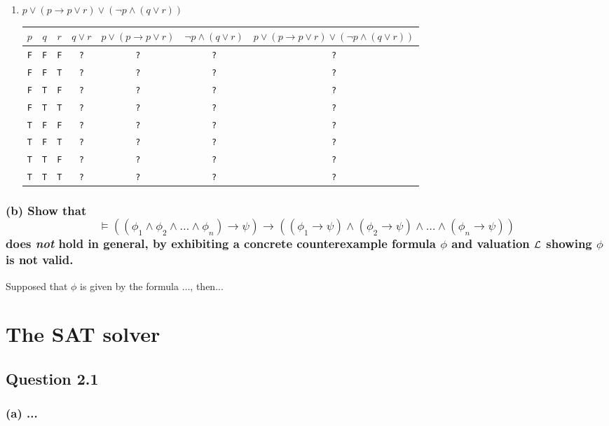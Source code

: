 \documentclass[10pt,a4paper]{article}
\let\imp\to
\begin{document}
\begin{enumerate}[i]
	\item
	{
	$p \lor (p \imp p \lor r) \lor (\neg p \land (q \lor r))$ \\
	\begin{tabular}{cccccc|c}
		$p$ & $q$ & $r$ &
		$q \lor r$ &
		$p \lor (p \imp p \lor r)$ &
		$\neg p \land (q \lor r)$ &
		$p \lor (p \imp p \lor r) \lor (\neg p \land (q \lor r))$ \\ \hline
		{\tt F} & {\tt F} & {\tt F} & {\tt ?} & {\tt ?} & {\tt ?} & {\tt ?} \\
		{\tt F} & {\tt F} & {\tt T} & {\tt ?} & {\tt ?} & {\tt ?} & {\tt ?} \\
		{\tt F} & {\tt T} & {\tt F} & {\tt ?} & {\tt ?} & {\tt ?} & {\tt ?} \\
		{\tt F} & {\tt T} & {\tt T} & {\tt ?} & {\tt ?} & {\tt ?} & {\tt ?} \\
		{\tt T} & {\tt F} & {\tt F} & {\tt ?} & {\tt ?} & {\tt ?} & {\tt ?} \\
		{\tt T} & {\tt F} & {\tt T} & {\tt ?} & {\tt ?} & {\tt ?} & {\tt ?} \\
		{\tt T} & {\tt T} & {\tt F} & {\tt ?} & {\tt ?} & {\tt ?} & {\tt ?} \\
		{\tt T} & {\tt T} & {\tt T} & {\tt ?} & {\tt ?} & {\tt ?} & {\tt ?} \\
	\end{tabular}
	}
\end{enumerate}

\subsubsection*{(b) \mdseries Show that \[\models \left((\phi_1 \land \phi_2
\land \dots \land \phi_n) \imp \psi \right) \imp \left( (\phi_1 \imp \psi)
\land (\phi_2 \imp \psi) \land \dots \land (\phi_n \imp \psi) \right)\] does
{\it not} hold in general, by exhibiting a concrete counterexample formula
$\phi$ and valuation $\cal L$ showing $\phi$ is not valid.} 
Supposed that $\phi$ is given by the formula $\dots$, then...

\section{The SAT solver}
\subsection*{Question 2.1}
\subsubsection*{(a) \mdseries ...}
\end{document}
